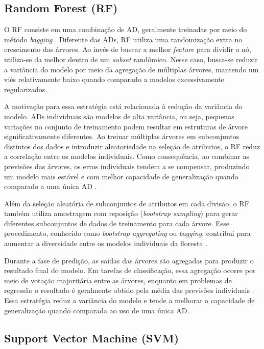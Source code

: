 \subsection{Random Forest (RF)}

O RF consiste em uma combinação de AD, geralmente treinadas por meio do método \textit{bagging} \cite{Geron2019}. Diferente das ADs, RF 
utiliza uma randomização extra no crescimento das árvores. Ao invés de buscar a melhor \textit{feature} para dividir o nó, 
utiliza-se da melhor dentro de um \textit{subset} randômico. Nesse caso, busca-se reduzir a variância do modelo por meio da agregação de 
múltiplas árvores, mantendo um viés relativamente baixo quando comparado a modelos excessivamente regularizados.

A motivação para essa estratégia está relacionada à redução da variância do modelo. ADs individuais são modelos de alta variância, 
ou seja, pequenas variações no conjunto de treinamento podem resultar em estruturas de árvore significativamente diferentes. Ao treinar múltiplas 
árvores em subconjuntos distintos dos dados e introduzir aleatoriedade na seleção de atributos, o RF reduz a correlação entre os modelos 
individuais. Como consequência, ao combinar as previsões das árvores, os erros individuais tendem a se compensar, produzindo um modelo mais estável 
e com melhor capacidade de generalização quando comparado a uma única AD \cite{Geron2019}.

Além da seleção aleatória de subconjuntos de atributos em cada divisão, o RF também utiliza amostragem com reposição (\textit{bootstrap sampling}) para 
gerar diferentes subconjuntos de dados de treinamento para cada árvore. Esse procedimento, conhecido como \textit{bootstrap aggregating} 
ou \textit{bagging}, contribui para aumentar a diversidade entre os modelos individuais da floresta \cite{Geron2019}. 

Durante a fase de predição, as saídas das árvores são agregadas para produzir o resultado final do modelo. Em tarefas de classificação, 
essa agregação ocorre por meio de votação majoritária entre as árvores, enquanto em problemas de regressão o resultado é geralmente obtido pela 
média das previsões individuais \cite{Geron2019}. Essa estratégia reduz a variância do modelo e tende a melhorar a capacidade de generalização quando comparada 
ao uso de uma única AD.

\subsection{Support Vector Machine (SVM)}

